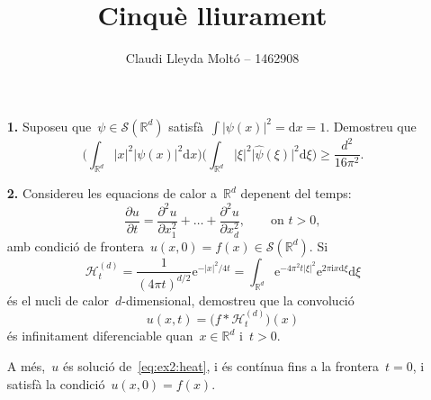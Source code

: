 \documentclass[a4paper]{article}
\title{Cinquè lliurament}
\author{Claudi Lleyda Moltó -- 1462908}
\theoremstyle{plain}
\theoremstyle{definition}
\newcommand{\iu}{\mathrm{i}}
\newcommand{\e}{\mathrm{e}}
\providecommand{\uppi}{\pi}
\newcommand{\diff}{\mathrm{d}}
\newcommand{\abs}[1]{\lvert{#1}\rvert}
\newcommand{\Sc}{\mathcal{S}}
\newcommand{\Hk}{\mathcal{H}}
\newcommand{\RR}{\mathbb{R}}
\begin{document}
\maketitle

\begin{enumerate}
    \item[\textbf{1.}] Suposeu que~\(\psi\in\Sc(\RR^{d})\)
        satisfà~\(\int\abs{\psi(x)}^{2}=\diff x=1\). Demostreu que
        \[
            \biggl(\int_{\RR^{d}}\abs{x}^{2}\abs{\psi(x)}^{2}\diff x\biggr)
            \biggl(\int_{\RR^{d}}\abs{\xi}^{2}\abs{\widehat{\psi}(\xi)}^{2}\diff\xi\biggr)
            \geq
            \frac{d^{2}}{16\uppi^{2}}.
        \]
\end{enumerate}

\begin{enumerate}
    \item[\textbf{2.}] Considereu les equacions de calor a~\(\RR^{d}\) depenent
        del temps:
    \begin{equation}
        \label{eq:ex2:heat}
        \frac{\partial u}{\partial t}
        =
        \frac{\partial^{2}u}{\partial x_{1}^{2}}
        + \dots +
        \frac{\partial^{2}u}{\partial x_{d}^{2}},
        \qquad
        \text{on }
        t>0,
    \end{equation}
    amb condició de frontera~\(u(x,0)=f(x)\in\Sc(\RR^{d})\).
    Si
    \[
        \Hk_{t}^{(d)}
        =
        \frac{1}{(4\uppi t)^{d/2}}
        \e^{-\abs{x}^{2}/4t}
        =
        \int_{\RR^{d}}
        \e^{-4\uppi^{2}t\abs{\xi}^{2}}
        \e^{2\uppi\iu x\diff\xi}
        \diff\xi
    \]
    és el nucli de calor~\(d\)-dimensional, demostreu que la convolució
    \[
        u(x,t)
        =
        \bigl(f\ast\Hk_{t}^{(d)}\bigr)(x)
    \]
    és infinitament diferenciable quan~\(x\in\RR^{d}\) i~\(t>0\).

    A més,~\(u\) és solució de~\eqref{eq:ex2:heat},
    i és contínua fins a la frontera~\(t=0\),
    i satisfà la condició~\(u(x,0)=f(x)\).
\end{enumerate}
\end{document}

